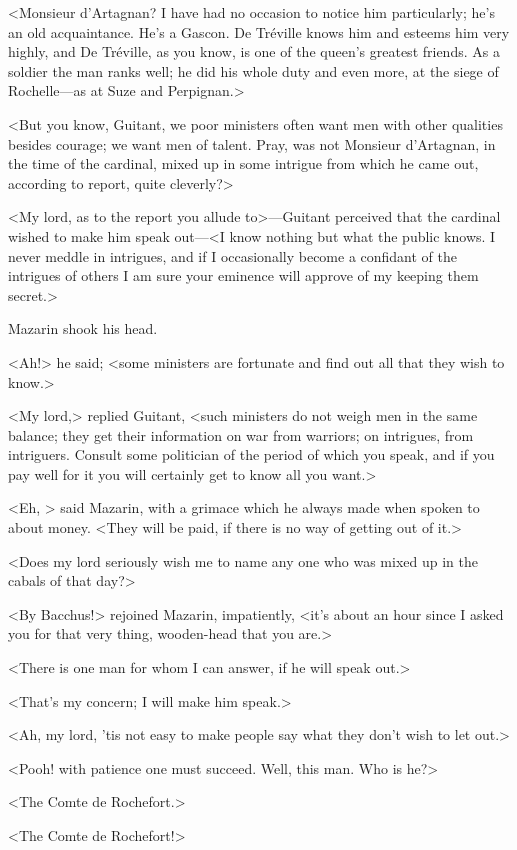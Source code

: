 <Monsieur d'Artagnan? I have had no occasion to notice him particularly; he's an old acquaintance. He's a Gascon. De Tréville knows him and esteems him very highly, and De Tréville, as you know, is one of the queen's greatest friends. As a soldier the man ranks well; he did his whole duty and even more, at the siege of Rochelle—as at Suze and Perpignan.>

<But you know, Guitant, we poor ministers often want men with other qualities besides courage; we want men of talent. Pray, was not Monsieur d'Artagnan, in the time of the cardinal, mixed up in some intrigue from which he came out, according to report, quite cleverly?>

<My lord, as to the report you allude to>—Guitant perceived that the cardinal wished to make him speak out—<I know nothing but what the public knows. I never meddle in intrigues, and if I occasionally become a confidant of the intrigues of others I am sure your eminence will approve of my keeping them secret.>

Mazarin shook his head.

<Ah!> he said; <some ministers are fortunate and find out all that they wish to know.>

<My lord,> replied Guitant, <such ministers do not weigh men in the same balance; they get their information on war from warriors; on intrigues, from intriguers. Consult some politician of the period of which you speak, and if you pay well for it you will certainly get to know all you want.>

<Eh, > said Mazarin, with a grimace which he always made when spoken to about money. <They will be paid, if there is no way of getting out of it.>

<Does my lord seriously wish me to name any one who was mixed up in the cabals of that day?>

<By Bacchus!> rejoined Mazarin, impatiently, <it's about an hour since I asked you for that very thing, wooden-head that you are.>

<There is one man for whom I can answer, if he will speak out.>

<That's my concern; I will make him speak.>

<Ah, my lord, 'tis not easy to make people say what they don't wish to let out.>

<Pooh! with patience one must succeed. Well, this man. Who is he?>

<The Comte de Rochefort.>

<The Comte de Rochefort!>


